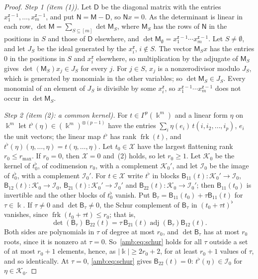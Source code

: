 \documentclass[11pt]{amsart}
\theoremstyle{definition}
\theoremstyle{remark}
\numberwithin{equation}{section}
\newcommand{\abs}[1]{\lvert #1\rvert}
\theoremstyle{plain}
\theoremstyle{definition}
\theoremstyle{plain}
\begin{document}
\begin{proof}
\emph{Step 1 (item (1)).} Let $\mathsf D$ be the diagonal matrix with the entries $x_1^{\mathsf z-1},\dots,x_m^{\mathsf z-1}$, and put
$\mathsf N=\mathsf M-\mathsf D$, so $\mathsf Nx=0$. As the determinant is linear in each row,
$\det\mathsf M=\sum_{S\subseteq[m]}\det\mathsf M_S$, where $\mathsf M_S$ has the rows of $\mathsf N$ in the positions in
$S$ and those of $\mathsf D$ elsewhere, and $\det\mathsf M_\emptyset=x_1^{\mathsf z-1}\cdots x_m^{\mathsf z-1}$. Let $S\ne\emptyset$, and
let $J_S$ be the ideal generated by the $x_i^{\mathsf z}$, $i\notin S$. The vector $\mathsf M_Sx$ has the entries $0$ in the
positions in $S$ and $x_i^{\mathsf z}$ elsewhere, so multiplication by the adjugate of $\mathsf M_S$ gives
$\det(\mathsf M_S)x_j\in J_S$ for every $j$. For $j\in S$, $x_j$ is a nonzerodivisor modulo $J_S$, which is generated
by monomials in the other variables; so $\det\mathsf M_S\in J_S$. Every monomial of an element of $J_S$ is divisible by
some $x_i^{\mathsf z}$, so $x_1^{\mathsf z-1}\cdots x_m^{\mathsf z-1}$ does not occur in $\det\mathsf M_S$.

\emph{Step 2 (item (2): a common kernel).} For $t\in\Gamma^p(\Bbbk^m)$ and a linear form $\eta$ on $\Bbbk^m$ let
$t^\flat(\eta)\in(\Bbbk^m)^{\otimes(p-1)}$ have the entries $\sum_i\eta(e_i)\,t(i,i_2,\dots,i_p)$, $e_i$ the unit
vectors; the linear map $t^\flat$ has rank $\operatorname{frk}(t)$, and $t^\flat(\eta)(\eta,\dots,\eta)=t(\eta,\dots,\eta)$.
Let $t_0\in\mathcal X$ have the largest flattening rank $r_0\le r_{\max}$. If $r_0=0$, then $\mathcal X=0$ and~(2) holds, so
let $r_0\ge1$. Let $\mathcal K_0$ be the kernel of $t_0^\flat$, of
codimension $r_0$, with a complement $\mathcal K_0'$, and let $\mathcal I_0$ be the image of $t_0^\flat$, with a complement
$\mathcal I_0'$. For $t\in\mathcal X$ write $t^\flat$ in blocks $\mathsf B_{11}(t)\colon\mathcal K_0'\to\mathcal I_0$,
$\mathsf B_{12}(t)\colon\mathcal K_0\to\mathcal I_0$, $\mathsf B_{21}(t)\colon\mathcal K_0'\to\mathcal I_0'$ and
$\mathsf B_{22}(t)\colon\mathcal K_0\to\mathcal I_0'$; then $\mathsf B_{11}(t_0)$ is invertible and the other blocks of
$t_0^\flat$ vanish. Put $\mathsf B_\tau=\mathsf B_{11}(t_0)+\tau\mathsf B_{11}(t)$ for $\tau\in\Bbbk$. If $\tau\ne0$ and
$\det\mathsf B_\tau\ne0$, the Schur complement of $\mathsf B_\tau$ in $(t_0+\tau t)^\flat$ vanishes, since
$\operatorname{frk}(t_0+\tau t)\le r_0$; that is,
\begin{equation}\label{amb:eq:schur}
 \det(\mathsf B_\tau)\,\mathsf B_{22}(t)=\tau\,\mathsf B_{21}(t)\operatorname{adj}(\mathsf B_\tau)\mathsf B_{12}(t).
\end{equation}
Both sides are polynomials in $\tau$ of degree at most $r_0$, and $\det\mathsf B_\tau$ has at most $r_0$ roots, since it is
nonzero at $\tau=0$. So~\eqref{amb:eq:schur} holds for all $\tau$ outside a set of at most $r_0+1$ elements, hence, as
$\abs\Bbbk\ge2r_0+2$, for at least $r_0+1$ values of $\tau$, and so identically. At $\tau=0$, \eqref{amb:eq:schur} gives
$\mathsf B_{22}(t)=0$: $t^\flat(\eta)\in\mathcal I_0$ for $\eta\in\mathcal K_0$.


\end{proof}
\end{document}

